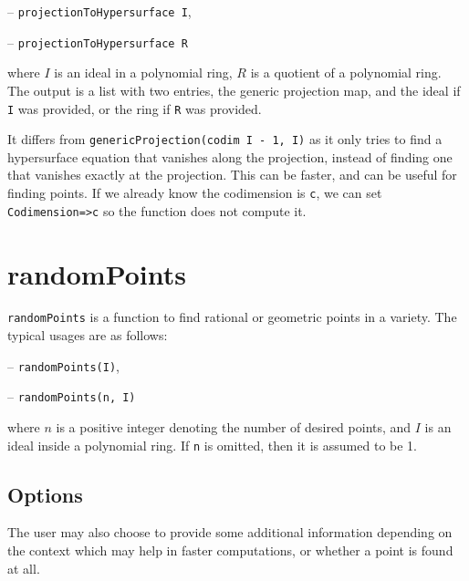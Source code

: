 \documentclass[11pt]{amsart}
\theoremstyle{definition}
\begin{document}
\vspace{1em}
-- {\tt projectionToHypersurface I},

-- {\tt projectionToHypersurface R} 

\vspace{1em}
\noindent where $I$ is an ideal in a polynomial ring, $R$ is a quotient of a polynomial ring. The output is
a list with two entries, the generic projection map, and the ideal if {\tt I} was provided, or the ring if {\tt R} was provided.

It differs from {\tt genericProjection(codim I - 1, I)} as it only tries to find a hypersurface equation that vanishes along the projection, instead of finding one that vanishes exactly at the projection.  This can be faster, and can be useful for finding points.   If we already know the codimension is {\tt c}, we can set {\tt Codimension=>c} so the function does not compute it. 



\section{randomPoints}\label{randomPoints}
{\tt randomPoints} is a function to find rational or geometric points in a variety. The typical usages are as follows: 

\vspace{1em}
-- {\tt randomPoints(I)}, 

-- {\tt randomPoints(n, I)} 

\vspace{1em}
\noindent where $n$ is a positive integer denoting the number of desired points, and 
$I$ is an ideal inside a polynomial ring.  If {\tt n} is omitted, then it is assumed to be 1.


\subsection{Options}\label{strategydetails}

The user may also choose to provide some additional information depending on the context which may help in faster computations, or whether a point is found at all.
\end{document}
